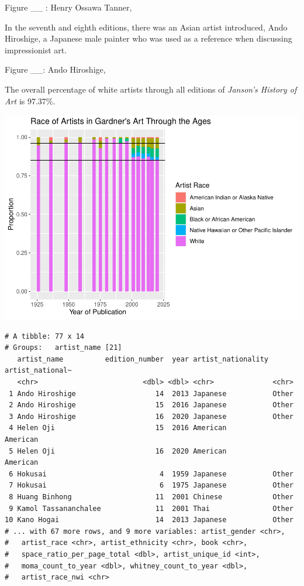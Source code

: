 \documentclass[
  letterpaper,
  DIV=11,
  numbers=noendperiod]{scrreprt}
\begin{document}
Figure \_\_ : Henry Ossawa Tanner,

In the seventh and eighth editions, there was an Asian artist
introduced, Ando Hiroshige, a Japanese male painter who was used as a
reference when discussing impressionist art.

Figure \_\_: Ando Hiroshige,

The overall percentage of white artists through all editions of
\emph{Janson's History of Art} is 97.37\%.

\includegraphics{Chapter1/Chapter1_files/figure-pdf/gardnerracethroughtime-1.pdf}

\begin{verbatim}
# A tibble: 77 x 14
# Groups:   artist_name [21]
   artist_name          edition_number  year artist_nationality artist_national~
   <chr>                         <dbl> <dbl> <chr>              <chr>           
 1 Ando Hiroshige                   14  2013 Japanese           Other           
 2 Ando Hiroshige                   15  2016 Japanese           Other           
 3 Ando Hiroshige                   16  2020 Japanese           Other           
 4 Helen Oji                        15  2016 American           American        
 5 Helen Oji                        16  2020 American           American        
 6 Hokusai                           4  1959 Japanese           Other           
 7 Hokusai                           6  1975 Japanese           Other           
 8 Huang Binhong                    11  2001 Chinese            Other           
 9 Kamol Tassananchalee             11  2001 Thai               Other           
10 Kano Hogai                       14  2013 Japanese           Other           
# ... with 67 more rows, and 9 more variables: artist_gender <chr>,
#   artist_race <chr>, artist_ethnicity <chr>, book <chr>,
#   space_ratio_per_page_total <dbl>, artist_unique_id <int>,
#   moma_count_to_year <dbl>, whitney_count_to_year <dbl>,
#   artist_race_nwi <chr>
\end{verbatim}
\end{document}

